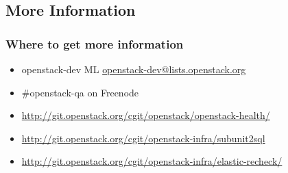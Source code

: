 \documentclass[aspectratio=169,11pt,hyperref={colorlinks=true}]{beamer}
\begin{document}
\subsection{More Information}
\begin{frame}
\frametitle{Where to get more information}
  \begin{itemize}
    \item openstack-dev ML\: \href{mailto:openstack-dev@lists.openstack.org}{openstack-dev@lists.openstack.org}
    \item \#openstack-qa on Freenode
    \item \href{http://git.openstack.org/cgit/openstack/openstack-health/}{http://git.openstack.org/cgit/openstack/openstack-health/}
    \item \href{http://git.openstack.org/cgit/openstack-infra/subunit2sql}{http://git.openstack.org/cgit/openstack-infra/subunit2sql}
    \item \href{http://git.openstack.org/cgit/openstack-infra/elastic-recheck/}{http://git.openstack.org/cgit/openstack-infra/elastic-recheck/}
  \end{itemize}
\end{frame}

\end{document}
